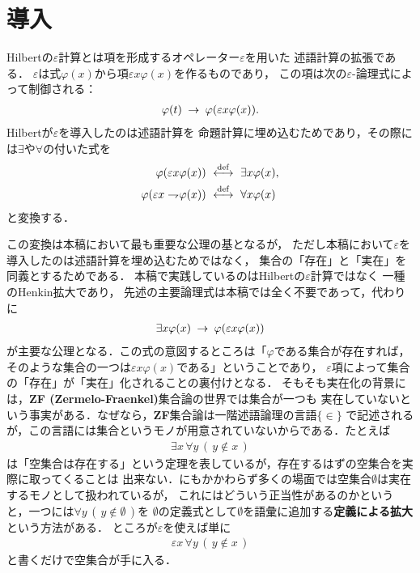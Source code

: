 \section{導入}
	Hilbert\cite{Hilbert}の$\varepsilon$計算とは項を形成するオペレーター$\varepsilon$を用いた
	述語計算の拡張である．
	$\varepsilon$は式$\varphi(x)$から項$\varepsilon x \varphi(x)$を作るものであり，
	この項は次の$\varepsilon$-論理式によって制御される：
	\begin{align}
		\varphi(t) \hspace{0.25em}\rightarrow\hspace{0.25em} \varphi(\varepsilon x \varphi(x)).
		\label{fom:introduction_1}
	\end{align}
	Hilbertが$\varepsilon$を導入したのは述語計算を
	命題計算に埋め込むためであり，その際には$\exists$や$\forall$の付いた式を
	\begin{align}
		\varphi(\varepsilon x \varphi(x)) &\ \overset{\mathrm{def}}{\longleftrightarrow}\  \exists x \varphi(x), \\
		\varphi(\varepsilon x \rightharpoondown\hspace{-0.25em} \varphi(x)) &\ \overset{\mathrm{def}}{\longleftrightarrow}\  \forall x \varphi(x)
	\end{align}
	と変換する．
	
	この変換は本稿において最も重要な公理の基となるが，
	ただし本稿において$\varepsilon$を導入したのは述語計算を埋め込むためではなく，
	集合の「存在」と「実在」を同義とするためである．
	本稿で実践しているのはHilbertの$\varepsilon$計算ではなく
	一種のHenkin拡大であり，%
	先述の主要論理式は本稿では全く不要であって，代わりに
	\begin{align}
		\exists x \varphi(x) \hspace{0.25em}\rightarrow\hspace{0.25em} \varphi(\varepsilon x \varphi(x))
		\label{fom:introduction_2}
	\end{align}
	が主要な公理となる．この式の意図するところは「$\varphi$である集合が存在すれば，
	そのような集合の一つは$\varepsilon x \varphi(x)$である」ということであり，
	$\varepsilon$項によって集合の「存在」が「実在」化されることの裏付けとなる．
	そもそも実在化の背景には，{\bf ZF (Zermelo-Fraenkel)}集合論の世界では集合が一つも
	実在していないという事実がある．なぜなら，{\bf ZF}集合論は一階述語論理の言語$\{\in\}$
	で記述されるが，この言語には集合というモノが用意されていないからである．たとえば
	\begin{align}
		\exists x\, \forall y\, (\, y \notin x\, )
	\end{align}
	は「空集合は存在する」という定理を表しているが，存在するはずの空集合を実際に取ってくることは
	出来ない．にもかかわらず多くの場面では空集合$\emptyset$は実在するモノとして扱われているが，
	これにはどういう正当性があるのかというと，一つには$\forall y\, (\, y \notin \emptyset\, )$を
	$\emptyset$の定義式として$\emptyset$を語彙に追加する{\bf 定義による拡大}
	という方法がある．
	ところが$\varepsilon$を使えば単に
	\begin{align}
		\varepsilon x\, \forall y\, (\, y \notin x\, )
	\end{align}
	と書くだけで空集合が手に入る．
	
